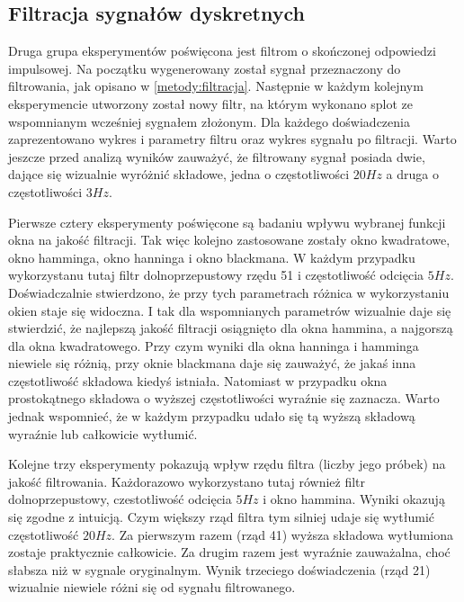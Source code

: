 \documentclass{article}
\begin{document}
    \subsection{Filtracja sygnałów dyskretnych} {
        Druga grupa eksperymentów poświęcona jest filtrom o skończonej odpowiedzi
        impulsowej. Na początku wygenerowany został sygnał przeznaczony do filtrowania,
        jak opisano w \ref{metody:filtracja}. Następnie w każdym kolejnym eksperymencie
        utworzony został nowy filtr, na którym wykonano splot ze wspomnianym wcześniej
        sygnałem złożonym. Dla każdego doświadczenia zaprezentowano wykres i parametry
        filtru oraz wykres sygnału po filtracji. Warto jeszcze przed analizą wyników
        zauważyć, że filtrowany sygnał posiada dwie, dające się wizualnie wyróżnić
        składowe, jedna o częstotliwości $20Hz$ a druga o częstotliwości $3Hz$.

        Pierwsze cztery eksperymenty poświęcone są badaniu wpływu wybranej funkcji
        okna na jakość filtracji. Tak więc kolejno zastosowane zostały okno
        kwadratowe, okno hamminga, okno hanninga i okno blackmana. W każdym przypadku
        wykorzystanu tutaj filtr dolnoprzepustowy rzędu 51 i częstotliwość odcięcia
        $5Hz$. Doświadczalnie stwierdzono, że przy tych parametrach różnica w
        wykorzystaniu okien staje się widoczna. I tak dla wspomnianych parametrów
        wizualnie daje się stwierdzić, że najlepszą jakość filtracji osiągnięto dla
        okna hammina, a najgorszą dla okna kwadratowego. Przy czym wyniki dla okna
        hanninga i hamminga niewiele się różnią, przy oknie blackmana daje się
        zauważyć, że jakaś inna częstotliwość składowa kiedyś istniała. Natomiast w
        przypadku okna prostokątnego składowa o wyższej częstotliwości wyraźnie się
        zaznacza. Warto jednak wspomnieć, że w każdym przypadku udało się tą wyższą
        składową wyraźnie lub całkowicie wytłumić.

        Kolejne trzy eksperymenty pokazują wpływ rzędu filtra (liczby jego próbek) na
        jakość filtrowania. Każdorazowo wykorzystano tutaj również filtr
        dolnoprzepustowy, czestotliwość odcięcia $5Hz$ i okno hammina. Wyniki okazują
        się zgodne z intuicją. Czym większy rząd filtra tym silniej udaje się wytłumić
        częstotliwość $20Hz$. Za pierwszym razem (rząd 41) wyższa składowa wytłumiona
        zostaje praktycznie całkowicie. Za drugim razem jest wyraźnie zauważalna, choć
        słabsza niż w sygnale oryginalnym. Wynik trzeciego doświadczenia (rząd 21)
        wizualnie niewiele różni się od sygnału filtrowanego.

}
\end{document}
